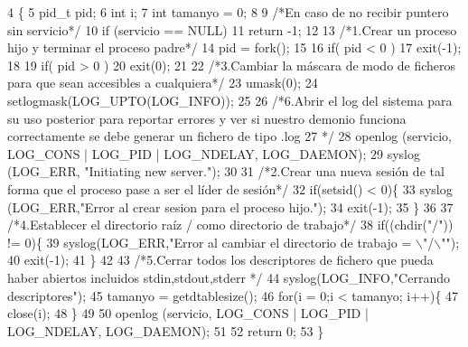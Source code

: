 \begin{DoxyCode}
4                                  \{
5         pid\_t pid;
6         \textcolor{keywordtype}{int} i;
7         \textcolor{keywordtype}{int} tamanyo = 0;
8         
9         \textcolor{comment}{/*En caso de no recibir puntero sin servicio*/}
10         \textcolor{keywordflow}{if} (servicio == NULL)
11                 \textcolor{keywordflow}{return} -1;
12         
13         \textcolor{comment}{/*1.Crear un proceso hijo y terminar el proceso padre*/}
14         pid = fork();
15 
16         \textcolor{keywordflow}{if}( pid < 0 ) 
17                 exit(-1);
18 
19         \textcolor{keywordflow}{if}( pid > 0 ) 
20                 exit(0);
21 
22         \textcolor{comment}{/*3.Cambiar la máscara de modo de ficheros para que sean accesibles a cualquiera*/}
23         umask(0);
24         setlogmask(LOG\_UPTO(LOG\_INFO));
25         
26         \textcolor{comment}{/*6.Abrir el log del sistema para su uso posterior para reportar errores y ver si nuestro demonio
       funciona correctamente se debe generar un fichero de tipo .log}
27 \textcolor{comment}{        */} 
28         openlog (servicio, LOG\_CONS | LOG\_PID | LOG\_NDELAY, LOG\_DAEMON);
29         syslog (LOG\_ERR, \textcolor{stringliteral}{"Initiating new server."});
30         
31         \textcolor{comment}{/*2.Crear una nueva sesión de tal forma que el proceso pase a ser el líder de sesión*/}
32         \textcolor{keywordflow}{if}(setsid() < 0)\{
33                 syslog (LOG\_ERR,\textcolor{stringliteral}{"Error al crear sesion para el proceso hijo."});
34                 exit(-1);
35         \}
36 
37         \textcolor{comment}{/*4.Establecer el directorio raíz / como directorio de trabajo*/}
38         \textcolor{keywordflow}{if}((chdir(\textcolor{stringliteral}{"/"})) != 0)\{
39                 syslog(LOG\_ERR,\textcolor{stringliteral}{"Error al cambiar el directorio de trabajo = \(\backslash\)"/\(\backslash\)""});
40                 exit(-1);
41         \}
42 
43         \textcolor{comment}{/*5.Cerrar todos los descriptores de fichero que pueda haber abiertos incluidos stdin,stdout,stderr
      */}
44         syslog(LOG\_INFO,\textcolor{stringliteral}{"Cerrando descriptores"});
45         tamanyo = getdtablesize();
46         \textcolor{keywordflow}{for}(i = 0;i < tamanyo; i++)\{
47                 close(i);
48         \}
49 
50         openlog (servicio, LOG\_CONS | LOG\_PID | LOG\_NDELAY, LOG\_DAEMON);
51 
52         \textcolor{keywordflow}{return} 0;
53 \}
\end{DoxyCode}
